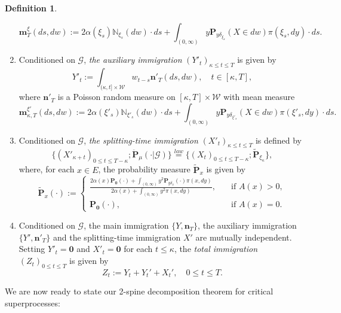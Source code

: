 \documentclass[UTF8]{pkuthss}
\theoremstyle{plain}
\theoremstyle{definition}
\newtheorem{defi}[thm]{Definition}
\numberwithin{equation}{section}
\begin{document}
\begin{defi}
\begin{enumerate}
\[
	\mathbf m_T^\xi (ds,dw)
:=  2 \alpha(\xi_s)  \mathbb N_{\xi_s}(dw)\cdot ds
 + \int_{(0,\infty)} y \mathbf P_{y\delta_{\xi_s}}(X\in dw) \pi(\xi_s,dy)\cdot ds.
\]
\item
	Conditioned on $\mathscr G$, \emph{the auxiliary immigration} $(Y'_t)_{\kappa \leq t \leq T}$ is given by
\[
	Y'_t
	:= \int_{(\kappa,t] \times \mathcal W} w_{t-s} \mathbf n'_T(ds,dw),
	\quad t \in [\kappa,T],
\]
	where $\mathbf n'_T$ is a
	Poisson random measure on $[\kappa,T] \times \mathcal W$ with mean measure
\[
	\mathbf m^{\xi'}_{\kappa,T}(ds,dw)
:=  2 \alpha(\xi'_s)  \mathbb N_{\xi'_s}(dw)\cdot ds
+  \int_{(0,\infty)} y \mathbf P_{y\delta_{\xi'_s}}(X\in dw) \pi(\xi'_s,dy)\cdot ds.
\]
\item
	Conditioned on $\mathscr G$, \emph{the splitting-time immigration}
$(X'_t)_{\kappa \leq t \leq T}$ is defined by
\[
	\{(X'_{\kappa+t})_{0\leq t\leq T-\kappa}; \ddot{\mathbf P}_\mu(\cdot | \mathscr G)\}
	\overset{law}{=} \{(X_t)_{0 \leq t \leq T-\kappa}; \widetilde{\mathbf P}_{\xi_\kappa}\},
\]
where, for each $x\in E$, the probability measure $\widetilde{\mathbf P}_{x}$ is given by
\begin{equation}\label{eq:def-tilde-P}
	\widetilde{\mathbf P}_{x}(\cdot)
	:=
\begin{cases}
	\frac{2\alpha(x) \mathbf P_{\mathbf 0}(\cdot)+\int_{(0,\infty)}y^2\mathbf P_{y\delta_x}(\cdot)\pi(x,dy)}{2\alpha(x)+\int_{(0,\infty)}y^2\pi(x,dy)},
	&\quad \mbox{if } A(x)>0,\\
	\mathbf P_{\mathbf 0}(\cdot),
	&\quad \mbox{if } A(x)=0.
\end{cases}
\end{equation}
\item
	Conditioned on $\mathscr G$, the main immigration
	$\{Y,\mathbf n_T\}$, the auxiliary immigration $\{Y',\mathbf n'_T\}$ and the splitting-time immigration $X'$ are mutually independent.
	Setting $Y'_t = \mathbf 0$ and $X'_t = \mathbf 0$ for each $t\leq \kappa$, the \emph{total immigration $(Z_t)_{0\leq t\leq T}$} is given by
\[
	Z_t
	:= Y_t + Y_t' + X_t',
	\quad 0\leq t\leq T.
\]
\end{enumerate}
\end{defi}

We are now ready to state our 2-spine decomposition theorem for critical superprocesses:
\end{document}
